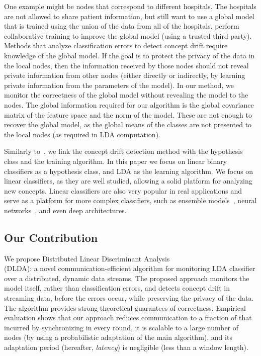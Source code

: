     One example might be nodes that correspond to different hospitals. The hospitals are not allowed to share patient information, but still want to use a global model that is trained using the union of the data from all of the hospitals.
    perform collaborative training to improve the global model (using a trusted third party).
    Methods that analyze classification errors to detect concept drift require knowledge of the global model. If the goal is to protect the privacy of the data in the local nodes, then the information received by those nodes should not reveal private information from other nodes (either directly or indirectly, by learning private information from the parameters of the model).
    In our method, we monitor the correctness of the global model without revealing the model to the nodes. The global information required for our algorithm is the global covariance matrix of the feature space and the norm of the model. These are not enough to recover the global model, as the global means of the classes are not presented to the local nodes (as required in LDA computation).



Similarly to~\cite{icml2014c2_harel14}, we link the concept drift detection method with the
hypothesis class and the training algorithm.
In this paper we focus on linear binary classifiers as a hypothesis class, and
LDA \cite{fisher1936use} as the learning algorithm.
We focus on linear classifiers, as they are well studied, allowing a solid platform for analyzing new concepts. Linear classifiers are also very popular in real applications and serve as a platform for more complex classifiers, such as ensemble models~\cite{Deva, eSVM},
neural networks~\cite{osadchy2015k}, and even deep architectures\cite{ROSS}.


\subsection{Our Contribution}
We propose Distributed Linear Discriminant Analysis
\\ (DLDA): a novel communication-efficient algorithm for monitoring LDA classifier over a distributed, dynamic data streams.
The proposed approach monitors the model itself, rather than classification errors,
and detects concept drift in streaming data, before the errors occur, while  preserving the privacy of the data.
The algorithm provides strong theoretical guarantees of correctness.
Empirical evaluation shows that our approach reduces communication to a fraction of that incurred by synchronizing in every round, it is scalable to a large number of nodes (by using a probabilistic adaptation of the main algorithm), and its adaptation period (hereafter, \textit{latency}) is negligible  (less than a window length).


